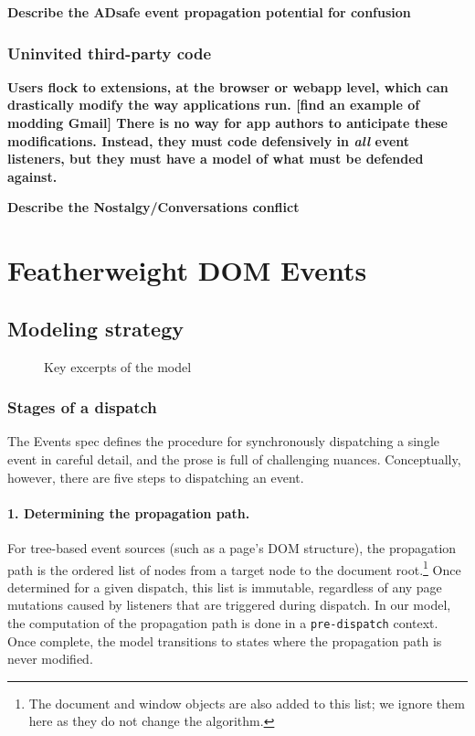 \documentclass[letterpaper,10pt,twocolumn]{article}
\newcommand{\quot}{\mbox{\tt\char'042}}
\newcommand{\wild}{\mbox{\tt\char'137}}
\newcommand{\impl}[1]{{\def\_{\wild}\def\"{\quot}\tt#1}}
\begin{document}
\textbf{Describe the ADsafe event propagation potential for confusion}
\lipsum[2]

\subsubsection{Uninvited third-party code}
\textbf{Users flock to extensions, at the browser or webapp level,
  which can drastically modify the way applications run. [find an
  example of modding Gmail]  There is no way for app authors to
  anticipate these modifications.  Instead, they must code defensively
  in \emph{all} event listeners, but they must have a model of what
  must be defended against.}
\lipsum[1]

\textbf{Describe the Nostalgy/Conversations conflict}
\lipsum[3-6]

\section{Featherweight DOM Events}
\subsection{Modeling strategy}
\begin{figure*}
  \lipsum[1-3]
  \caption{Key excerpts of the model}
\end{figure*}
\subsubsection{Stages of a dispatch} The Events spec defines the procedure
for synchronously dispatching a single event in careful detail, and
the prose is full of challenging nuances.  Conceptually, however,
there are five steps to dispatching an event.

\paragraph{1. Determining the propagation path.} For tree-based event
sources (such as a page's DOM structure), the propagation path is the
ordered list of nodes from a target node to the document
root.\footnote{The document and window objects are also added to this
  list; we ignore them here as they do not change the algorithm.}
Once determined for a given dispatch, this list is immutable,
regardless of any page mutations caused by listeners that are
triggered during dispatch.  In our model, the computation of the
propagation path is done in a \impl{pre-dispatch} context.  Once
complete, the model transitions to states where the propagation path
is never modified. 
\end{document}
